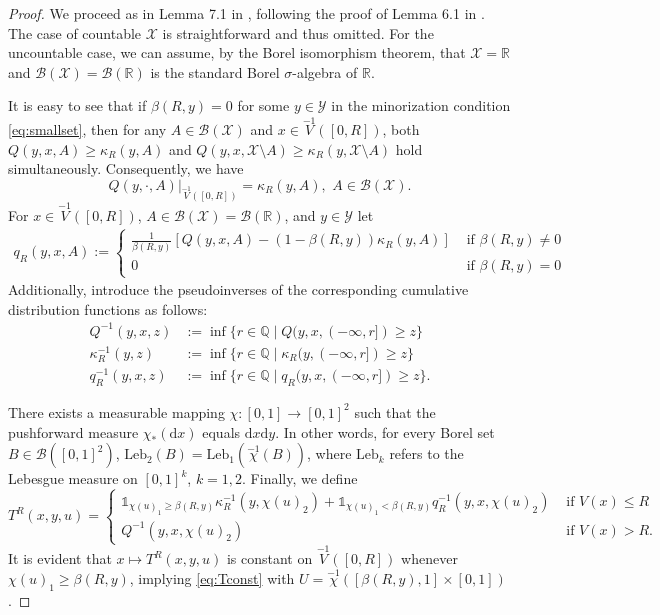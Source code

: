 \documentclass[a4paper,10pt]{article}
\newcommand{\Q}{\mathbb{Q}}
\newcommand{\R}{\mathbb{R}}
\newcommand{\B}{\mathcal{B}}
\newcommand{\X}{\mathcal{X}}
\newcommand{\Y}{\mathcal{Y}}
\newcommand{\ind}{\mathds{1}}
\newcommand{\ka}{\kappa}
\newcommand{\dint}{\mathrm{d}}  %
\newcommand{\leb}{\mathrm{Leb}}
\begin{document}
\begin{proof}
	We proceed as in Lemma 7.1 in \cite{lovas}, following the proof of Lemma 6.1 in \cite{rasonyi2018}. The case of countable $\X$ is straightforward and thus omitted. For the uncountable case, we can assume, by the Borel isomorphism theorem, that $\X=\R$ and $\B(\X)=\B(\R)$ is the standard Borel $\sigma$-algebra of $\R$.
	
	It is easy to see that if $\beta (R,y)=0$ for some $y\in\Y$ in the minorization condition \eqref{eq:smallset}, then for any $A\in\B (\X)$ and $x\in \stackrel{-1}{V}([0,R])$, both $Q(y,x,A) \ge \ka_R (y,A)$ and $Q(y,x,\X\setminus A) \ge \ka_R (y,\X\setminus A)$ hold simultaneously. Consequently, we have
	\begin{equation*}
	Q(y,\cdot,A)\vert_{\stackrel{-1}{V}([0,R])} = \ka_R (y,A),\,\, A\in\B(\X).
	\end{equation*}
	For $x\in\stackrel{-1}{V}([0,R])$, $A\in\B (\X)=\B(\R)$, and $y\in\Y$ let
\begin{align*}
q_R(y,x,A) := \begin{cases}
\frac{1}{\beta (R, y)}\left[
Q(y,x,A)-(1-\beta (R, y))\ka_R (y,A)
\right] & \text{ if } \beta (R, y)\ne 0\\[1.2em]
0 & \text{ if } \beta (R, y)=0
\end{cases}
\end{align*}
Additionally, introduce the pseudoinverses of the corresponding cumulative distribution functions as follows:
\begin{align*}
Q^{-1}(y,x,z) &:=  \inf \{r\in\Q\mid Q(y,x,(-\infty,r])\ge z\} \\
\ka_R^{-1}(y,z) &:= \inf \{r\in\Q\mid \ka_R (y,(-\infty,r])\ge z\} \\
q_R^{-1}(y,x,z) &:=  \inf \{r\in\Q\mid q_R(y,x,(-\infty,r])\ge z\}.	
\end{align*}
	
There exists a measurable mapping $\chi:[0,1]\to [0,1]^2$ such that the pushforward measure
$\chi_*(\dint x)$ equals $\dint x\dint y$. In other words, for every Borel set $B\in\B ([0,1]^2)$, $\leb_2 (B)=\leb_1 (\stackrel{-1}{\chi}(B))$, where $\leb_k$ refers to the Lebesgue measure on $[0,1]^k$, $k=1,2$.
Finally, we define
\begin{equation*}
T^R (x,y,u) =\begin{cases}
\ind_{\chi (u)_1\ge \beta (R,y)}\ka_R^{-1}(y,\chi (u)_2)
+\ind_{\chi (u)_1<\beta (R,y)} q_R^{-1}(y,x,\chi (u)_2)
& \text{ if } V(x)\le R \\
Q^{-1}(y,x,\chi (u)_2) & \text{ if } V(x)>R.
\end{cases}
\end{equation*}
It is evident that $x\mapsto T^R (x,y,u)$ is constant on $\stackrel{-1}{V}([0,R])$ whenever $\chi (u)_1\ge \beta (R,y)$, implying \eqref{eq:Tconst} with $U = \stackrel{-1}{\chi}([\beta (R,y),1]\times [0,1])$. 



\end{proof}
\end{document}
